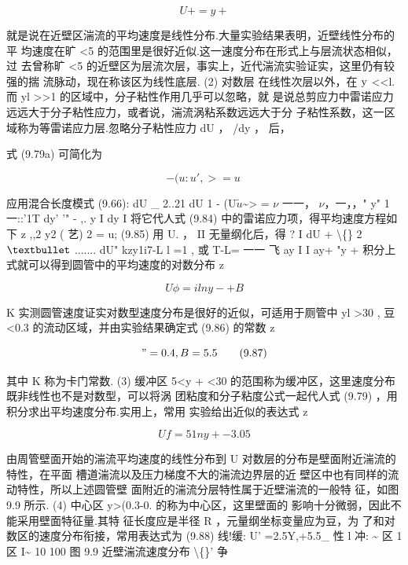 \begin{equation*}U+ = y+\tag{9.83}\end{equation*}

就是说在近壁区湍流的平均速度是线性分布.大量实验结果表明，近壁线性分布的平 均速度在旷 <5 的范围里是很好近似.这一速度分布在形式上与层流状态相似，过 去曾称旷 <5 的近壁区为层流次层，事实上，近代湍流实验证实，这里仍有较强的揣 流脉动，现在称该区为线性底层. (2) 对数层 在线性次层以外，在 ${\rm y}$ <<l. 而 yl >>1 的区域中，分子粘性作用几乎可以忽略，就 是说总剪应力中雷诺应力远远大于分子粘性应力，或者说，湍流涡粘系数远远大于分 子粘性系数，这一区域称为等雷诺应力层.忽略分子粘性应力 dU ， /dy ， 后，

式 (9.79a) 可简化为

\begin{equation*}- (u:u' ,> = u~\tag{9.84}\end{equation*}

应用混合长度模式 (9.66): dU \_ 2..21 dU 1 - (U$\tilde{u}$\textasciitilde{}> = $\nu$ 一一， $\nu$，一，，" y" 1 一::'1T dy' '" - ,. y I dy I 将它代人式 (9.84) 中的雷诺应力项，得平均速度方程如下 z ,,2 y2 ( 艺) 2 = u; (9.85) 用 U. ， II 无量纲化后，得 ? I dU + \textbackslash\{\} 2 ${\rm •}$ ....... dU" kzy1i7-L l =1 , 或 T-L= 一一 飞 ay I I ay+ "y + 积分上式就可以得到圆管中的平均速度的对数分布 z

\begin{equation*}U \phi  =ilny -+ B\tag{9.86}\end{equation*}

K 实测圆管速度证实对数型速度分布是很好的近似，可适用于厕管中 yl >30 , 豆 <0.3 的流动区域，并由实验结果确定式 (9.86) 的常数 z

\begin{equation*}" = 0.4 , B = 5.5\tag{9.87}\end{equation*}

其中 K 称为卡门常数. (3) 缓冲区 5<y + <30 的范围称为缓冲区，这里速度分布既非线性也不是对数型，可以将涡 团粘度和分子粘度公式一起代人式 (9.79) ，用积分求出平均速度分布.实用上，常用 实验给出近似的表达式 z

\[U f = 51ny+-3.05\]

由周管壁面开始的湍流平均速度的线性分布到 U 对数层的分布是壁面附近湍流的特性，在平面 槽道湍流以及压力梯度不大的湍流边界层的近 壁区中也有同样的流动特性，所以上述圆管壁 面附近的湍流分层特性属于近壁湍流的一般特 征，如图 9.9 所示. (4) 中心区 y>(0.3-0. 的称为中心区，这里壁面的 影响十分微弱，因此不能采用壁面特征量.其特 征长度应是半径 R ，元量纲坐标变量应为豆，为 了和对数区的速度分布衔接，常用表达式为 (9.88) 线!缓: U' =2.5Y,+5.5\_ 性 l 冲: \textasciitilde{} 区 1 区 I\textasciitilde{} 10 100 图 9.9 近壁湍流速度分布 \textbackslash\{\}' 争

